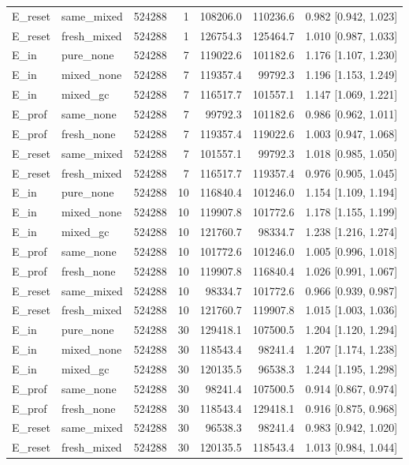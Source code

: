 \begin{longtable}{llrrrrc}
E\_reset & same\_mixed & 524288 & 1 & 108206.0 & 110236.6 & 0.982 [0.942, 1.023] \\
E\_reset & fresh\_mixed & 524288 & 1 & 126754.3 & 125464.7 & 1.010 [0.987, 1.033] \\
E\_in & pure\_none & 524288 & 7 & 119022.6 & 101182.6 & 1.176 [1.107, 1.230] \\
E\_in & mixed\_none & 524288 & 7 & 119357.4 & 99792.3 & 1.196 [1.153, 1.249] \\
E\_in & mixed\_gc & 524288 & 7 & 116517.7 & 101557.1 & 1.147 [1.069, 1.221] \\
E\_prof & same\_none & 524288 & 7 & 99792.3 & 101182.6 & 0.986 [0.962, 1.011] \\
E\_prof & fresh\_none & 524288 & 7 & 119357.4 & 119022.6 & 1.003 [0.947, 1.068] \\
E\_reset & same\_mixed & 524288 & 7 & 101557.1 & 99792.3 & 1.018 [0.985, 1.050] \\
E\_reset & fresh\_mixed & 524288 & 7 & 116517.7 & 119357.4 & 0.976 [0.905, 1.045] \\
E\_in & pure\_none & 524288 & 10 & 116840.4 & 101246.0 & 1.154 [1.109, 1.194] \\
E\_in & mixed\_none & 524288 & 10 & 119907.8 & 101772.6 & 1.178 [1.155, 1.199] \\
E\_in & mixed\_gc & 524288 & 10 & 121760.7 & 98334.7 & 1.238 [1.216, 1.274] \\
E\_prof & same\_none & 524288 & 10 & 101772.6 & 101246.0 & 1.005 [0.996, 1.018] \\
E\_prof & fresh\_none & 524288 & 10 & 119907.8 & 116840.4 & 1.026 [0.991, 1.067] \\
E\_reset & same\_mixed & 524288 & 10 & 98334.7 & 101772.6 & 0.966 [0.939, 0.987] \\
E\_reset & fresh\_mixed & 524288 & 10 & 121760.7 & 119907.8 & 1.015 [1.003, 1.036] \\
E\_in & pure\_none & 524288 & 30 & 129418.1 & 107500.5 & 1.204 [1.120, 1.294] \\
E\_in & mixed\_none & 524288 & 30 & 118543.4 & 98241.4 & 1.207 [1.174, 1.238] \\
E\_in & mixed\_gc & 524288 & 30 & 120135.5 & 96538.3 & 1.244 [1.195, 1.298] \\
E\_prof & same\_none & 524288 & 30 & 98241.4 & 107500.5 & 0.914 [0.867, 0.974] \\
E\_prof & fresh\_none & 524288 & 30 & 118543.4 & 129418.1 & 0.916 [0.875, 0.968] \\
E\_reset & same\_mixed & 524288 & 30 & 96538.3 & 98241.4 & 0.983 [0.942, 1.020] \\
E\_reset & fresh\_mixed & 524288 & 30 & 120135.5 & 118543.4 & 1.013 [0.984, 1.044] \\
\end{longtable}
